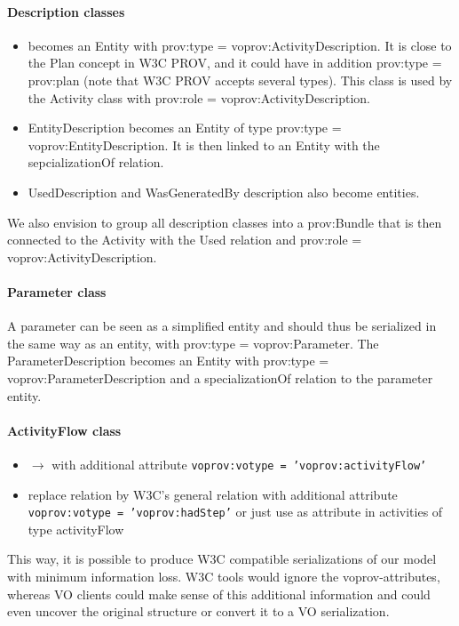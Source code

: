 \paragraph{Description classes}
\begin{itemize}
\item {} becomes an Entity with prov:type = voprov:ActivityDescription. It is close to the Plan concept in W3C PROV, and it could have in addition prov:type = prov:plan (note that W3C PROV accepts several types). This class is used by the Activity class with prov:role = voprov:ActivityDescription.
\item EntityDescription becomes an Entity of type prov:type = voprov:EntityDescription. It is then linked to an Entity with the sepcializationOf relation.
\item UsedDescription and WasGeneratedBy description also become entities.
\end{itemize}
We also envision to group all description classes into a prov:Bundle that is then connected to the Activity with the Used relation and prov:role = voprov:ActivityDescription.

\paragraph{Parameter class}
A parameter can be seen as a simplified entity and should thus be serialized in the same way as an entity, with prov:type = voprov:Parameter. The ParameterDescription becomes an Entity with prov:type = voprov:ParameterDescription and a specializationOf relation to the parameter entity.

\paragraph{ActivityFlow class}
\begin{itemize}
	\item {} $\rightarrow$  with additional attribute \texttt{voprov:votype = 'voprov:activityFlow'}
	\item replace  relation by W3C's general  relation with additional attribute \texttt{voprov:votype = 'voprov:hadStep'} or just use  as attribute in activities of type activityFlow
\end{itemize}

This way, it is possible to produce W3C compatible serializations of our model with minimum information loss. W3C tools would ignore the voprov-attributes, whereas VO clients could make sense of this additional information and could even uncover the original structure or convert it to a VO serialization.




